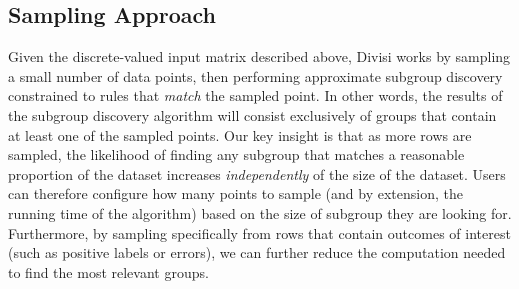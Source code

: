 

\subsection{Sampling Approach}
\label{sec:sampling-approach}

Given the discrete-valued input matrix described above, Divisi works by sampling a small number of data points, then performing approximate subgroup discovery constrained to rules that \textit{match} the sampled point. 
In other words, the results of the subgroup discovery algorithm will consist exclusively of groups that contain at least one of the sampled points. 
Our key insight is that as more rows are sampled, the likelihood of finding any subgroup that matches a reasonable proportion of the dataset increases \textit{independently} of the size of the dataset. 
Users can therefore configure how many points to sample (and by extension, the running time of the algorithm) based on the size of subgroup they are looking for.
Furthermore, by sampling specifically from rows that contain outcomes of interest (such as positive labels or errors), we can further reduce the computation needed to find the most relevant groups.

